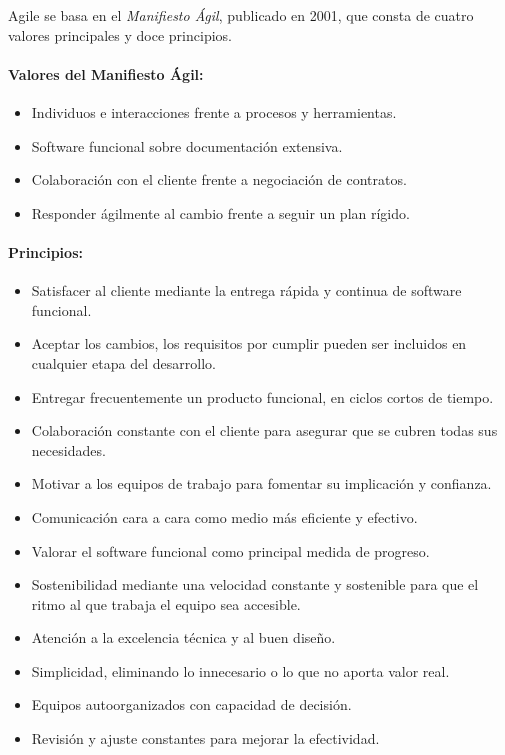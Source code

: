 Agile se basa en el \textit{Manifiesto Ágil}, publicado en 2001, que consta de cuatro valores principales y doce principios.

\paragraph{Valores del Manifiesto Ágil:}
\begin{itemize}
    \item Individuos e interacciones frente a procesos y herramientas.
    \item Software funcional sobre documentación extensiva.
    \item Colaboración con el cliente frente a negociación de contratos.
    \item Responder ágilmente al cambio frente a seguir un plan rígido.
\end{itemize}

\paragraph{Principios:}
\begin{itemize}
    \item Satisfacer al cliente mediante la entrega rápida y continua de software funcional.
    \item Aceptar los cambios, los requisitos por cumplir pueden ser incluidos en cualquier etapa del desarrollo.
    \item Entregar frecuentemente un producto funcional, en ciclos cortos de tiempo.
    \item Colaboración constante con el cliente para asegurar que se cubren todas sus necesidades.
    \item Motivar a los equipos de trabajo para fomentar su implicación y confianza.
    \item Comunicación cara a cara como medio más eficiente y efectivo.
    \item Valorar el software funcional como principal medida de progreso.
    \item Sostenibilidad mediante una velocidad constante y sostenible para que el ritmo al que trabaja el equipo sea accesible.
    \item Atención a la excelencia técnica y al buen diseño.
    \item Simplicidad, eliminando lo innecesario o lo que no aporta valor real.
    \item Equipos autoorganizados con capacidad de decisión.
    \item Revisión y ajuste constantes para mejorar la efectividad.
\end{itemize}

